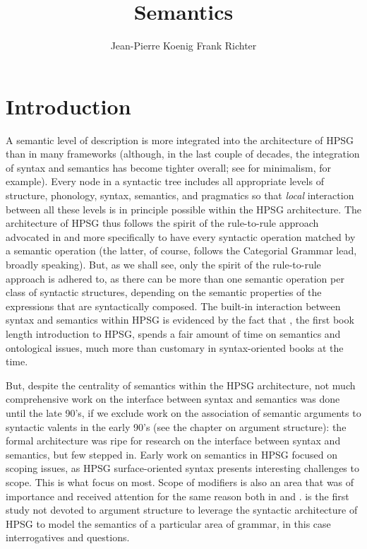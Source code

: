 \documentclass[output=paper]{langsci/langscibook}
\author{%
	Jean-Pierre Koenig\affiliation{University at Buffalo}%
	\lastand Frank Richter\affiliation{Goethe Universität Frankfurt}%
}
\title{Semantics}
\begin{document}
\label{chap-semantics}

\section{Introduction} 

A semantic level of description is more integrated into the architecture of HPSG than in many frameworks  (although, in the last couple of decades, the integration of syntax and semantics has become tighter overall; see \citet{HeimandKratzer1998} for minimalism, for example). Every node in a syntactic tree includes  all appropriate levels of structure, phonology, syntax, semantics, and pragmatics so that \emph{local} interaction between all these levels is in principle possible within the HPSG architecture. The architecture of HPSG thus follows the spirit of the rule-to-rule approach advocated in \citet{Bach1976} and more specifically \citet{KleinandSag1985} to have every syntactic operation matched by a semantic operation (the latter, of course, follows the Categorial Grammar lead, broadly speaking). But, as we shall see, only the spirit of the rule-to-rule approach is adhered to, as there can be more than one semantic operation per class of syntactic structures, depending on the semantic properties of the expressions that are syntactically composed. The built-in interaction between syntax and semantics within HPSG is evidenced by the fact that \citet{PollardandSag1987}, the first book length introduction to HPSG, spends a fair amount of time on semantics and ontological issues, much more than customary in syntax-oriented books at the time.

But, despite the centrality of semantics within the HPSG architecture, not much comprehensive work on the interface between syntax and semantics was done  until the late 90's, if we exclude work on the association of semantic arguments to syntactic valents in the early 90's (see the chapter on argument structure): the formal architecture was ripe for research on the interface between syntax and semantics, but few stepped in. Early work on semantics in HPSG focused on scoping issues, as HPSG surface-oriented syntax presents interesting challenges to scope. This is what \citet{PollardandSag1987,ps2} focus on most. Scope of modifiers is also an area that was of importance and received attention for the same reason both in \citet{ps2} and \citet{Kasper1997}. \cite{GinzburgandSag2001} is the first study not devoted to argument structure to leverage the syntactic architecture of HPSG to model the semantics of a particular area of grammar, in this case interrogatives and questions. 
\end{document}
